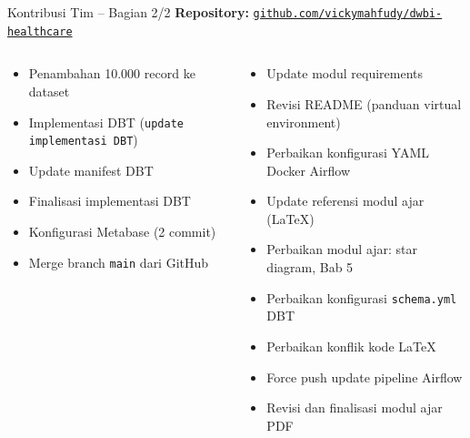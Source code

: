 \documentclass[xcolor=table,t,aspectratio=169]{beamer}
\begin{document}
\begin{frame}{Kontribusi Tim -- Bagian 2/2}
  \footnotesize
  \textbf{Repository:}
  \href{https://github.com/vickymahfudy/dwbi-healthcare}%
       {\texttt{github.com/vickymahfudy/dwbi-healthcare}}
  \vspace{6pt}

  \begin{columns}[T]
    \begin{tcolorbox}[kontribbox, title={\texttt{ghost-45-max} (Engelbertus Rande)}]
      \scriptsize
      \begin{itemize}\itemsep1pt
        \item Penambahan 10.000 record ke dataset
        \item Implementasi DBT (\texttt{update implementasi DBT})
        \item Update manifest DBT
        \item Finalisasi implementasi DBT
        \item Konfigurasi Metabase (2 commit)
        \item Merge branch \texttt{main} dari GitHub
      \end{itemize}
    \end{tcolorbox}

    \begin{tcolorbox}[kontribbox, title={\texttt{masibeth} (Gilbert Fandiliam Mooy)}]
      \scriptsize
      \begin{itemize}\itemsep1pt
        \item Update modul requirements
        \item Revisi README (panduan virtual environment)
        \item Perbaikan konfigurasi YAML Docker Airflow
        \item Update referensi modul ajar (LaTeX)
        \item Perbaikan modul ajar: star diagram, Bab 5
        \item Perbaikan konfigurasi \texttt{schema.yml} DBT
        \item Perbaikan konflik kode LaTeX
        \item Force push update pipeline Airflow
        \item Revisi dan finalisasi modul ajar PDF
      \end{itemize}
    \end{tcolorbox}
  \end{columns}
\end{frame}
\end{document}
